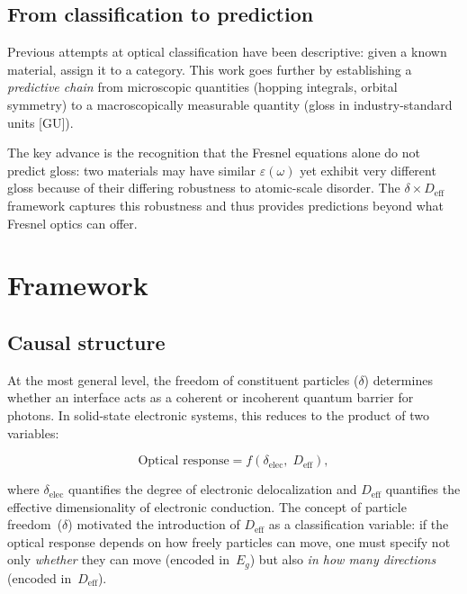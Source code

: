 \documentclass[twocolumn,showpacs,preprintnumbers,amsmath,amssymb,prb]{revtex4-2}
\begin{document}
\subsection{From classification to prediction}

Previous attempts at optical classification have been descriptive: given
a known material, assign it to a category. This work goes further by
establishing a \emph{predictive chain} from microscopic quantities
(hopping integrals, orbital symmetry) to a macroscopically measurable
quantity (gloss in industry-standard units [GU]).

The key advance is the recognition that the Fresnel equations alone do
not predict gloss: two materials may have similar $\varepsilon(\omega)$
yet exhibit very different gloss because of their differing robustness
to atomic-scale disorder. The $\delta \times D_\mathrm{eff}$ framework
captures this robustness and thus provides predictions beyond what
Fresnel optics can offer.

\section{Framework}
\label{sec:framework}

\subsection{Causal structure}

At the most general level, the freedom of constituent particles
($\delta$) determines whether an interface acts as a coherent or
incoherent quantum barrier for photons. In solid-state electronic
systems, this reduces to the product of two variables:

\begin{equation}
  \text{Optical response} = f\!\left(\delta_\mathrm{elec},\;
  D_\mathrm{eff}\right),
  \label{eq:causal}
\end{equation}

\noindent where $\delta_\mathrm{elec}$ quantifies the degree of
electronic delocalization and $D_\mathrm{eff}$ quantifies the effective
dimensionality of electronic conduction. The concept of particle
freedom~($\delta$) motivated the introduction of $D_\mathrm{eff}$ as a
classification variable: if the optical response depends on how freely
particles can move, one must specify not only \emph{whether} they can
move (encoded in~$E_g$) but also \emph{in how many directions}
(encoded in~$D_\mathrm{eff}$).
\end{document}
